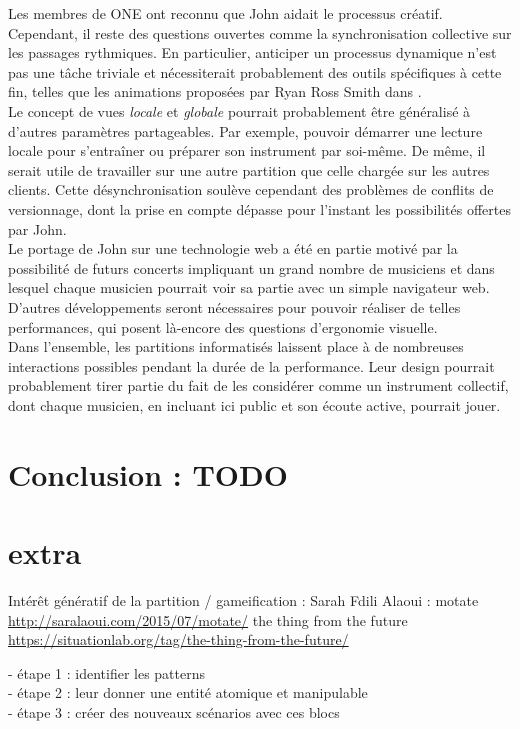 \noindent Les membres de ONE ont reconnu que John aidait le processus créatif. Cependant, il reste des questions ouvertes comme la synchronisation collective sur les passages rythmiques. En particulier, anticiper un processus dynamique n'est pas une tâche triviale et nécessiterait probablement des outils spécifiques à cette fin, telles que les animations proposées par Ryan Ross Smith dans \cite{smith_atomic_2015}.\\
\indent Le concept de vues \textit{locale} et \textit{globale} pourrait probablement être généralisé à d'autres paramètres partageables. Par exemple, pouvoir démarrer une lecture locale pour s'entraîner ou préparer son instrument par soi-même. De même, il serait utile de travailler sur une autre partition que celle chargée sur les autres clients. Cette désynchronisation soulève cependant des problèmes de conflits de versionnage, dont la prise en compte dépasse pour l'instant les possibilités offertes par John.\\
\indent Le portage de John sur une technologie web a été en partie motivé par la possibilité de futurs concerts impliquant un grand nombre de musiciens et dans lesquel chaque musicien pourrait voir sa partie avec un simple navigateur web. D'autres développements seront nécessaires pour pouvoir réaliser de telles performances, qui posent là-encore des questions d'ergonomie visuelle.\\
\indent Dans l'ensemble, les partitions informatisés laissent place à de nombreuses interactions possibles pendant la durée de la performance. Leur design pourrait probablement tirer partie du fait de les considérer comme un instrument collectif, dont chaque musicien, en incluant ici public et son écoute active, pourrait jouer.

\section{Conclusion : TODO}


\section*{extra}
Intérêt génératif de la partition / gameification  :
Sarah Fdili Alaoui : motate \url{http://saralaoui.com/2015/07/motate/}
the thing from the future \url{https://situationlab.org/tag/the-thing-from-the-future/}

- étape 1 : identifier les patterns \\
- étape 2 : leur donner une entité atomique et manipulable\\
- étape 3 : créer des nouveaux scénarios avec ces blocs